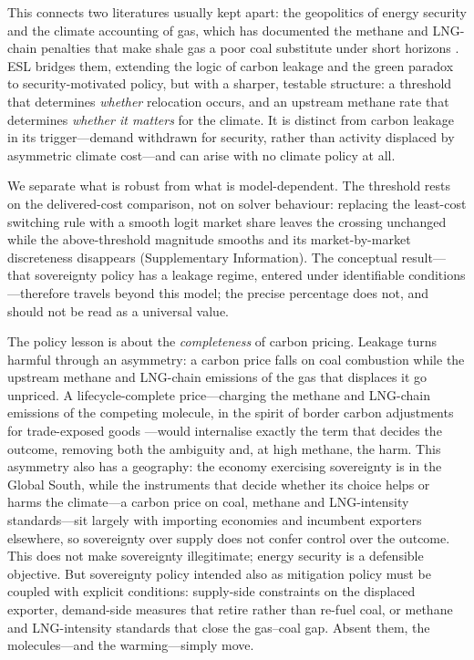 \documentclass[sn-nature]{sn-jnl}
\theoremstyle{thmstyleone}%
\theoremstyle{thmstyletwo}%
\theoremstyle{thmstylethree}%
\begin{document}
This connects two literatures usually kept apart: the geopolitics of energy
security and the climate accounting of gas, which has documented the methane and
LNG-chain penalties that make shale gas a poor coal substitute under short
horizons
\citep{howarth2024, iea_methane_2024, Balcombe2018, Ocko2021}. ESL bridges them,
extending the logic of carbon leakage \citep{FowlieReguant2018} and the
green paradox
\citep{greenparadox, vanderPloeg2012, Jensen2015, Harstad2012, Asheim2019} to
security-motivated policy, but with a sharper, testable structure: a threshold
that determines \emph{whether} relocation occurs, and an upstream methane rate
that determines \emph{whether it matters} for the climate. It is distinct from
carbon leakage in its trigger---demand withdrawn for security, rather than
activity displaced by asymmetric climate cost---and can arise with no climate
policy at all.

We separate what is robust from what is model-dependent. The threshold rests on
the delivered-cost comparison, not on solver behaviour: replacing the least-cost
switching rule with a smooth logit market share leaves the crossing unchanged
while the above-threshold magnitude smooths and its market-by-market discreteness
disappears (Supplementary Information). The conceptual result---that sovereignty
policy has a leakage regime, entered under identifiable conditions---therefore
travels beyond this model; the precise percentage does not, and should not be
read as a universal value.

The policy lesson is about the \emph{completeness} of carbon pricing. Leakage
turns harmful through an asymmetry: a carbon price falls on coal combustion
while the upstream methane and LNG-chain emissions of the gas that displaces it
go unpriced. A lifecycle-complete price---charging the methane and LNG-chain
emissions of the competing molecule, in the spirit of border carbon adjustments
for trade-exposed goods \citep{Branger2014}---would internalise exactly the term
that decides the outcome, removing both the ambiguity and, at high methane, the
harm. This asymmetry also has a geography: the economy exercising
sovereignty is in the Global South, while the instruments that decide whether its
choice helps or harms the climate---a carbon price on coal, methane and
LNG-intensity standards---sit largely with importing economies and incumbent
exporters elsewhere, so sovereignty over supply does not confer control over the
outcome. This does not make sovereignty illegitimate; energy security is a
defensible objective. But sovereignty policy intended also as mitigation policy
must be coupled with explicit conditions: supply-side constraints on the
displaced exporter, demand-side measures that retire rather than re-fuel coal, or
methane and LNG-intensity standards that close the gas--coal gap. Absent them,
the molecules---and the warming---simply move.
\end{document}
